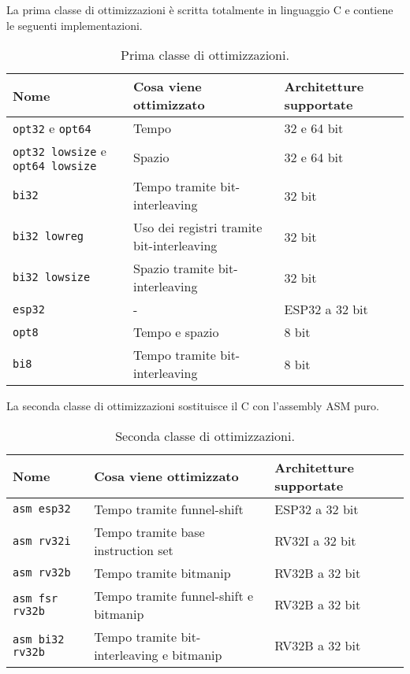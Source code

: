 \noindent La prima classe di ottimizzazioni è scritta totalmente in linguaggio C e contiene le seguenti implementazioni\cite{github}.

\begin{table}[H]
    \centering
	\begin{tabular}{|m{}<{\centering}||m{}<{\centering}|m{}<{\centering}|}
		\hline
        \textbf{Nome} & \textbf{Cosa viene ottimizzato} & \textbf{Architetture supportate} \\
		\hline \hline
        \texttt{opt32} e \texttt{opt64} & Tempo & 32 e 64 bit \\
        \hline
        \texttt{opt32 lowsize} e \texttt{opt64 lowsize} & Spazio & 32 e 64 bit \\
        \hline
        \texttt{bi32} & Tempo tramite bit-interleaving & 32 bit \\
        \hline
        \texttt{bi32 lowreg} & Uso dei registri tramite bit-interleaving & 32 bit \\
        \hline
        \texttt{bi32 lowsize} & Spazio tramite bit-interleaving & 32 bit \\
        \hline
        \texttt{esp32} & - & ESP32 a 32 bit \\
        \hline
        \texttt{opt8} & Tempo e spazio & 8 bit \\
        \hline
        \texttt{bi8} & Tempo tramite bit-interleaving & 8 bit \\
        \hline
    \end{tabular}
    \caption{Prima classe di ottimizzazioni.}
\end{table}

\noindent La seconda classe di ottimizzazioni sostituisce il C con l'assembly ASM puro\cite{github}.

\begin{table}[H]
    \centering
	\begin{tabular}{|m{}<{\centering}||m{}<{\centering}|m{}<{\centering}|}
		\hline
		\textbf{Nome} & \textbf{Cosa viene ottimizzato} & \textbf{Architetture supportate} \\
        \hline \hline
        \texttt{asm esp32} & Tempo tramite funnel-shift & ESP32 a 32 bit \\
        \hline
        \texttt{asm rv32i} & Tempo tramite base instruction set & RV32I a 32 bit \\
        \hline
        \texttt{asm rv32b} & Tempo tramite bitmanip & RV32B a 32 bit \\
        \hline
        \texttt{asm fsr rv32b} & Tempo tramite funnel-shift e bitmanip & RV32B a 32 bit \\
        \hline
        \texttt{asm bi32 rv32b} & Tempo tramite bit-interleaving e bitmanip & RV32B a 32 bit \\
        \hline
    \end{tabular}
    \caption{Seconda classe di ottimizzazioni.}
\end{table}

